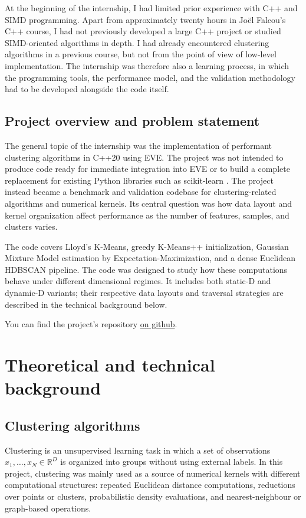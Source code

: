\documentclass[11pt,a4paper]{article}
\newcommand{\R}{\mathbb{R}}
\begin{document}
At the beginning of the internship, I had limited prior experience with C++ and SIMD programming. Apart from approximately twenty hours in Joël Falcou's C++ course, I had not previously developed a large C++ project or studied SIMD-oriented algorithms in depth. I had already encountered clustering algorithms in a previous course, but not from the point of view of low-level implementation. The internship was therefore also a learning process, in which the programming tools, the performance model, and the validation methodology had to be developed alongside the code itself.

\subsection{Project overview and problem statement}

The general topic of the internship was the implementation of performant clustering algorithms in C++20 using EVE. The project was not intended to produce code ready for immediate integration into EVE or to build a complete replacement for existing Python libraries such as scikit-learn \cite{pedregosa2011scikit}. The project instead became a benchmark and validation codebase for clustering-related algorithms and numerical kernels. Its central question was how data layout and kernel organization affect performance as the number of features, samples, and clusters varies.

The code covers Lloyd's K-Means, greedy K-Means++ initialization, Gaussian Mixture Model estimation by Expectation-Maximization, and a dense Euclidean HDBSCAN pipeline. The code was designed to study how these computations behave under different dimensional regimes. It includes both static-D and dynamic-D variants; their respective data layouts and traversal strategies are described in the technical background below.

You can find the project's repository \href{https://github.com/Bafy78/simd_clustering}{on github}.

\section{Theoretical and technical background}

\subsection{Clustering algorithms}

Clustering is an unsupervised learning task in which a set of observations \(x_1,\ldots,x_N \in \R^D\) is organized into groups without using external labels. In this project, clustering was mainly used as a source of numerical kernels with different computational structures: repeated Euclidean distance computations, reductions over points or clusters, probabilistic density evaluations, and nearest-neighbour or graph-based operations.
\end{document}
